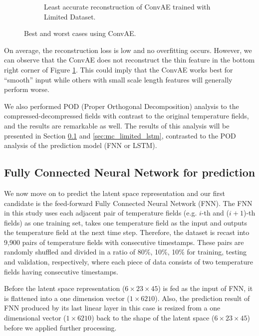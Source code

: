\begin{figure}[H]
\begin{subfigure}{0.45\textwidth}
    \caption{Least accurate reconstruction of ConvAE trained with Limited Dataset.}
    \label{figure:ConvAE_limited_worst}
\end{subfigure}     
\caption{Best and worst cases using ConvAE.}
\label{figure:ConvAE_limited_best_worst}
\end{figure}


On average, the reconstruction loss is low and no overfitting occurs. However, we can observe that the ConvAE does not reconstruct the thin feature in the bottom right corner of Figure \ref{figure:ConvAE_limited_worst}. This could imply that the ConvAE works best for ``smooth'' input while others with small scale length features will generally perform worse.

We also performed POD (Proper Orthogonal Decomposition) analysis to the compressed-decompressed fields with contrast to the original temperature fields, and the results are remarkable as well. The results of this analysis will be presented in Section \ref{sec:mc_limited_fnn} and \ref{sec:mc_limited_lstm}, contrasted to the POD analysis of the prediction model (FNN or LSTM).


\subsection{Fully Connected Neural Network for prediction}
\label{sec:mc_limited_fnn}

We now move on to predict the latent space representation and our first candidate is the feed-forward Fully Connected Neural Network (FNN). The FNN in this study uses each adjacent pair of temperature fields (e.g. $i$-th and ($i+1$)-th fields) as one training set, takes one temperature field as the input and outputs the temperature field at the next time step. Therefore, the dataset is recast into 9,900 pairs of temperature fields with consecutive timestamps. These pairs are randomly shuffled and divided in a ratio of 80\%, 10\%, 10\% for training, testing and validation, respectively, where each piece of data consists of two temperature fields having consecutive timestamps.

Before the latent space representation ($6 \times 23 \times 45$) is fed as the input of FNN, it is flattened into a one dimension vector ($1 \times 6210$). Also, the prediction result of FNN produced by its last linear layer in this case is resized from a one dimensional vector ($1 \times 6210$) back to the shape of the latent space ($6 \times 23 \times 45$) before we applied further processing.


